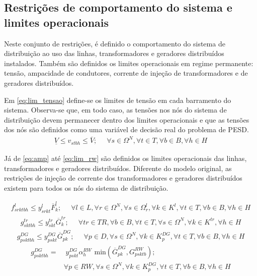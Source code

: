 \subsection{Restrições de comportamento do sistema e limites operacionais}

Neste conjunto de restrições, é definido o comportamento do sistema de distribuição ao uso das linhas, transformadores e geradores distribuídos instalados. Também são definidos os limites operacionais em regime permanente: tensão, ampacidade de condutores, corrente de injeção de transformadores e de geradores distribuídos.

Em \eqref{eq:lim_tensao} define-se os limites de tensão em cada barramento do sistema. Observa-se que, em todo caso, as tensões nos nós do sistema de distribuição devem permanecer dentro dos limites operacionais e que as tensões dos nós são definidos como uma variável de decisão real do problema de \ac{PESD}.
\begin{align}
    \underline{V} \leq v_{stbh} \leq \overline{V}; \; \;& \forall s \in \Omega^N, \forall t \in T, \forall b \in B, \forall h \in H
    \label{eq:lim_tensao}
\end{align}


Já de \eqref{eq:amp} até \eqref{eq:lim_rw} são definidos os limites operacionais das linhas, transformadores e geradores distribuídos. Diferente do modelo original, as restrições de injeção de corrente dos transformadores e geradores distribuídos existem para todos os nós do sistema de distribuição.

\begin{align}
   f^{l}_{srktbh} \leq y^l_{srkt} \overline{F}^l_k; \; \; &\forall l \in L, \forall r \in \Omega^N, \forall s \in \Omega^{l}_r, \forall k \in K^{l}, \forall t \in T, \forall b \in B, \forall h \in H
   \label{eq:amp}
\end{align}
\begin{align}%
   g^{tr}_{sktbh} \leq y^{tr}_{skt} \overline{G}^{tr}_k; \; \; &\forall tr \in TR, \forall b \in B, \forall t \in T,  \forall s \in \Omega^{N}, \forall k \in K^{tr}, \forall h \in H
   \label{eq:ijec}
\end{align}
\begin{align}%
   g^{DG}_{psktbh} \leq y^{DG}_{pskt}\overline{G}^{DG}_{pk}; \; \; &\forall p \in D,  \forall s \in \Omega^{N}, \forall k \in K^{DG}_p, \forall t \in T, \forall b \in B, \forall h \in H
   \label{eq:lim_dg}
\end{align}
\begin{align}
   g^{DG}_{psktbh} =  & \;y^{DG}_{pskt} \alpha^{RW}_h \text{ min} \left( \overline{G}^{DG}_{pk}, G^{RW}_{psktb} \right); \nonumber\\&\forall p \in RW,  \forall s \in \Omega^{N}, \forall k \in K^{DG}_p, \forall t \in T, \forall b \in B, \forall h \in H
   \label{eq:lim_rw}
\end{align}

